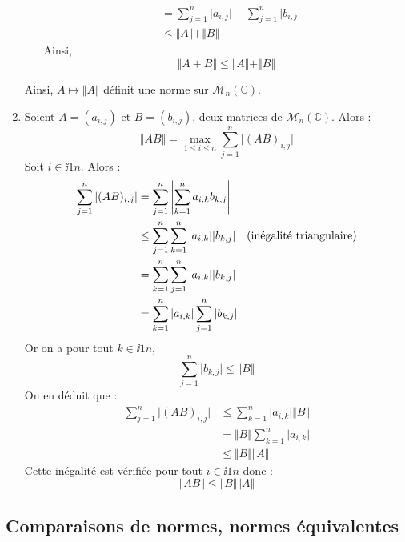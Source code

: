 \documentclass[a4paper,twoside,french,11pt]{VcCours}
\begin{document}
\begin{enumerate}
\begin{itemize}
\begin{align*}
 & = \sum_{j=1}^n \vert a_{i,j} \vert + \sum_{j=1}^n \vert b_{i,j} \vert  \\
 & \leq \Vert A \Vert + \Vert B \Vert
 \end{align*}
Ainsi,
$$ \Vert A+B \Vert \leq \Vert A \Vert + \Vert B \Vert$$
\end{itemize}
Ainsi, $A \mapsto \Vert A \Vert$ définit une norme sur $\mathcal{M}_{n}(\mathbb{C})$.
\item Soient $A=(a_{i,j})$ et $B=(b_{i,j})$, deux matrices de $\mathcal{M}_n(\mathbb{C})$. Alors :
$$ \Vert AB \Vert = \max_{1 \leq i \leq n} \sum_{j=1}^n \vert (AB)_{i,j} \vert$$
Soit $i \in \ii{1}{n}$. Alors :
\begin{align*}
\sum_{j=1}^n \vert (AB)_{i,j} \vert & = \sum_{j=1}^n \left\vert \sum_{k=1}^n a_{i,k} b_{k,j} \right\vert \\
& \leq  \sum_{j=1}^n  \sum_{k=1}^n \vert a_{i,k} \vert \vert b_{k,j} \vert \quad \hbox{(inégalité triangulaire)} \\
& = \sum_{k=1}^n  \sum_{j=1}^n \vert a_{i,k} \vert \vert b_{k,j} \vert  \\
& =  \sum_{k=1}^n \vert a_{i,k} \vert  \sum_{j=1}^n \vert b_{k,j} \vert  
\end{align*}
Or on a pour tout $k \in \ii{1}{n}$,
$$ \sum_{j=1}^n \vert b_{k,j} \vert   \leq \Vert B \Vert$$
On en déduit que :
\begin{align*}
\sum_{j=1}^n \vert (AB)_{i,j} \vert  & \leq  \sum_{k=1}^n \vert a_{i,k} \vert \Vert B \Vert \\
& = \Vert B \Vert  \sum_{k=1}^n \vert a_{i,k} \vert \\
& \leq \Vert B \Vert \Vert A \Vert
\end{align*}
Cette inégalité est vérifiée pour tout $i \in \ii{1}{n}$ donc :
$$ \Vert AB \Vert \leq \Vert B \Vert \Vert A \Vert$$
\end{enumerate}






\subsection{Comparaisons de normes, normes équivalentes}
\end{document}
